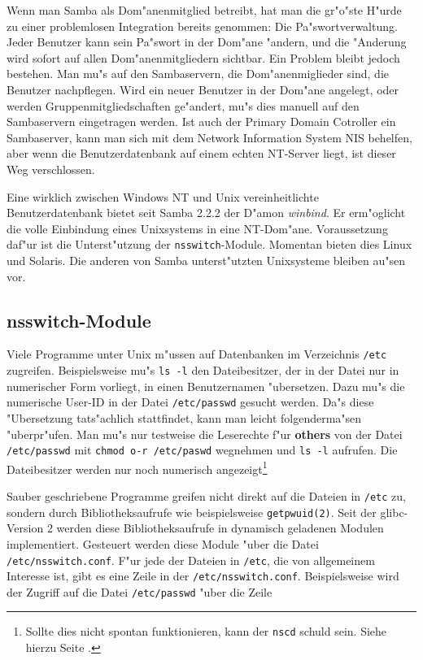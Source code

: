 \documentclass{scrartcl}\usepackage{pslatex}\typearea{12}
\newcommand{\prog}{\texttt}
\newcommand{\dateistyle}{\texttt}
\newcommand{\defin}{\emph}
\newcommand{\username}{\textbf}
\begin{document}
Wenn man Samba als Dom"anenmitglied betreibt, hat man die gr"o"ste
H"urde zu einer problemlosen Integration bereits genommen: Die
Pa"swortverwaltung. Jeder Benutzer kann sein Pa"swort in der Dom"ane
"andern, und die "Anderung wird sofort auf allen Dom"anenmitgliedern
sichtbar. Ein Problem bleibt jedoch bestehen. Man mu"s auf den
Sambaservern, die Dom"anenmiglieder sind, die Benutzer
nachpflegen. Wird ein neuer Benutzer in der Dom"ane angelegt, oder
werden Gruppenmitgliedschaften ge"andert, mu"s dies manuell auf den
Sambaservern eingetragen werden. Ist auch der Primary Domain Cotroller
ein Sambaserver, kann man sich mit dem Network Information System NIS
behelfen, aber wenn die Benutzerdatenbank auf einem echten NT-Server
liegt, ist dieser Weg verschlossen.

Eine wirklich zwischen Windows NT und Unix vereinheitlichte
Benutzerdatenbank bietet seit Samba 2.2.2 der D"amon
\defin{winbind}. Er erm"oglicht die volle Einbindung eines Unixsystems
in eine NT-Dom"ane. Voraussetzung daf"ur ist die Unterst"utzung der
\prog{nsswitch}-Module. Momentan bieten dies Linux und Solaris. Die
anderen von Samba unterst"utzten Unixsysteme bleiben au"sen vor.

\subsection{nsswitch-Module}

Viele Programme unter Unix m"ussen auf Datenbanken im Verzeichnis
\dateistyle{/etc} zugreifen. Beispielsweise mu"s \prog{ls -l} den
Dateibesitzer, der in der Datei nur in numerischer Form vorliegt, in
einen Benutzernamen "ubersetzen. Dazu mu"s die numerische User-ID in
der Datei \dateistyle{/etc/passwd} gesucht werden. Da"s diese
"Ubersetzung tats"achlich stattfindet, kann man leicht folgenderma"sen
"uberpr"ufen. Man mu"s nur testweise die Leserechte f"ur
\username{others} von der Datei \dateistyle{/etc/passwd} mit
\prog{chmod o-r /etc/paswd} wegnehmen und \prog{ls -l} aufrufen. Die
Dateibesitzer werden nur noch numerisch angezeigt\footnote{Sollte dies
nicht spontan funktionieren, kann der \prog{nscd} schuld sein. Siehe
hierzu Seite \pageref{nscd}.}

Sauber geschriebene Programme greifen nicht direkt auf die Dateien in
\dateistyle{/etc} zu, sondern durch Bibliotheksaufrufe wie beispielsweise
\prog{getpwuid(2)}. Seit der glibc-Version 2 werden diese Bibliotheksaufrufe
in dynamisch geladenen Modulen implementiert. Gesteuert werden diese Module
"uber die Datei \dateistyle{/etc/nsswitch.conf}. F"ur jede der Dateien in
\dateistyle{/etc}, die von allgemeinem Interesse ist, gibt es eine
Zeile in der \dateistyle{/etc/nsswitch.conf}. Beispielsweise wird der
Zugriff auf die Datei \dateistyle{/etc/passwd} "uber die Zeile
\end{document}
